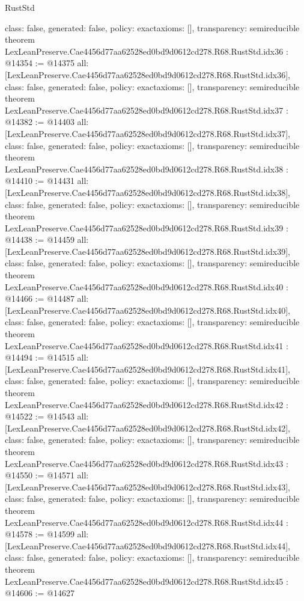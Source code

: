 \begin{lexlean}{RustStd}
\begin{coremodule}
{  class: false,
  generated: false,
  policy: exact{axioms: []},
  transparency: semireducible
}
theorem LexLeanPreserve.Cae4456d77aa62528ed0bd9d0612cd278.R68.RustStd.idx36 : @14354 := @14375 {
  all: [LexLeanPreserve.Cae4456d77aa62528ed0bd9d0612cd278.R68.RustStd.idx36],
  class: false,
  generated: false,
  policy: exact{axioms: []},
  transparency: semireducible
}
theorem LexLeanPreserve.Cae4456d77aa62528ed0bd9d0612cd278.R68.RustStd.idx37 : @14382 := @14403 {
  all: [LexLeanPreserve.Cae4456d77aa62528ed0bd9d0612cd278.R68.RustStd.idx37],
  class: false,
  generated: false,
  policy: exact{axioms: []},
  transparency: semireducible
}
theorem LexLeanPreserve.Cae4456d77aa62528ed0bd9d0612cd278.R68.RustStd.idx38 : @14410 := @14431 {
  all: [LexLeanPreserve.Cae4456d77aa62528ed0bd9d0612cd278.R68.RustStd.idx38],
  class: false,
  generated: false,
  policy: exact{axioms: []},
  transparency: semireducible
}
theorem LexLeanPreserve.Cae4456d77aa62528ed0bd9d0612cd278.R68.RustStd.idx39 : @14438 := @14459 {
  all: [LexLeanPreserve.Cae4456d77aa62528ed0bd9d0612cd278.R68.RustStd.idx39],
  class: false,
  generated: false,
  policy: exact{axioms: []},
  transparency: semireducible
}
theorem LexLeanPreserve.Cae4456d77aa62528ed0bd9d0612cd278.R68.RustStd.idx40 : @14466 := @14487 {
  all: [LexLeanPreserve.Cae4456d77aa62528ed0bd9d0612cd278.R68.RustStd.idx40],
  class: false,
  generated: false,
  policy: exact{axioms: []},
  transparency: semireducible
}
theorem LexLeanPreserve.Cae4456d77aa62528ed0bd9d0612cd278.R68.RustStd.idx41 : @14494 := @14515 {
  all: [LexLeanPreserve.Cae4456d77aa62528ed0bd9d0612cd278.R68.RustStd.idx41],
  class: false,
  generated: false,
  policy: exact{axioms: []},
  transparency: semireducible
}
theorem LexLeanPreserve.Cae4456d77aa62528ed0bd9d0612cd278.R68.RustStd.idx42 : @14522 := @14543 {
  all: [LexLeanPreserve.Cae4456d77aa62528ed0bd9d0612cd278.R68.RustStd.idx42],
  class: false,
  generated: false,
  policy: exact{axioms: []},
  transparency: semireducible
}
theorem LexLeanPreserve.Cae4456d77aa62528ed0bd9d0612cd278.R68.RustStd.idx43 : @14550 := @14571 {
  all: [LexLeanPreserve.Cae4456d77aa62528ed0bd9d0612cd278.R68.RustStd.idx43],
  class: false,
  generated: false,
  policy: exact{axioms: []},
  transparency: semireducible
}
theorem LexLeanPreserve.Cae4456d77aa62528ed0bd9d0612cd278.R68.RustStd.idx44 : @14578 := @14599 {
  all: [LexLeanPreserve.Cae4456d77aa62528ed0bd9d0612cd278.R68.RustStd.idx44],
  class: false,
  generated: false,
  policy: exact{axioms: []},
  transparency: semireducible
}
theorem LexLeanPreserve.Cae4456d77aa62528ed0bd9d0612cd278.R68.RustStd.idx45 : @14606 := @14627 {
}
\end{coremodule}
\end{lexlean}
